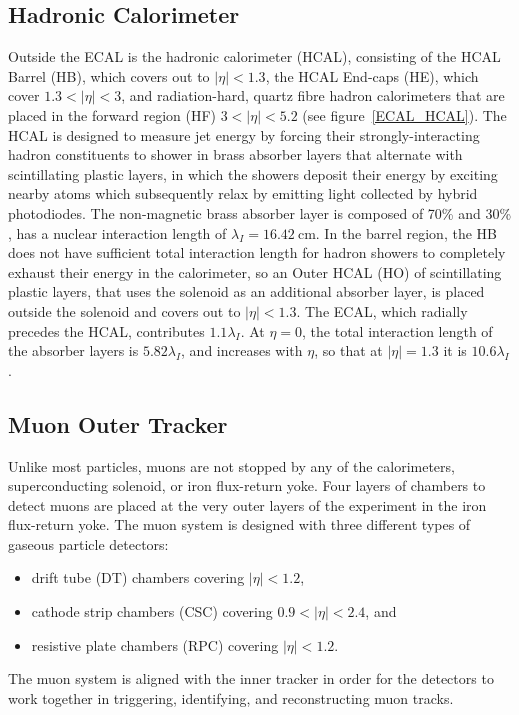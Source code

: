 \subsection{Hadronic Calorimeter}
Outside the ECAL is the hadronic calorimeter (HCAL), consisting of the HCAL Barrel (HB), which covers out to $\vert \eta \vert < 1.3$, the HCAL End-caps (HE), which cover $1.3 < \vert \eta \vert < 3$, and radiation-hard, quartz fibre hadron calorimeters that are placed in the forward region (HF) $3 < \vert \eta \vert < 5.2$ (see figure~\ref{ECAL_HCAL}).
The HCAL is designed to measure jet energy by forcing their strongly-interacting hadron constituents to shower in brass absorber layers that alternate with scintillating plastic layers, in which the showers deposit their energy by exciting nearby atoms which subsequently relax by emitting light collected by hybrid photodiodes.
The non-magnetic brass absorber layer is composed of 70\%  and 30\% , has a nuclear interaction length of $\lambda_I = \SI{16.42}{\cm}$.
In the barrel region, the HB does not have sufficient total interaction length for hadron showers to completely exhaust their energy in the calorimeter, so an Outer HCAL (HO) of scintillating plastic layers, that uses the solenoid as an additional absorber layer, is placed outside the solenoid and covers out to $\vert \eta \vert < 1.3$.
The ECAL, which radially precedes the HCAL, contributes $1.1\lambda_I$.
At $\eta = 0$, the total interaction length of the absorber layers is $5.82\lambda_I$, and increases with $\eta$, so that at $\vert \eta \vert = 1.3$ it is $10.6\lambda_I$.

\subsection{Muon Outer Tracker}
Unlike most particles, muons are not stopped by any of the calorimeters, superconducting solenoid, or iron flux-return yoke. 
Four layers of chambers to detect muons are placed at the very outer layers of the experiment in the iron flux-return yoke. 
The muon system is designed with three different types of gaseous particle detectors: 
\begin{itemize}
\item drift tube (DT) chambers covering $\vert \eta \vert < 1.2$,
\item cathode strip chambers (CSC) covering $0.9 < \vert \eta \vert < 2.4$, and
\item resistive plate chambers (RPC) covering $\vert \eta \vert < 1.2$.
\end{itemize}
The muon system is aligned with the inner tracker in order for the detectors to work together in triggering, identifying, and reconstructing muon tracks.

